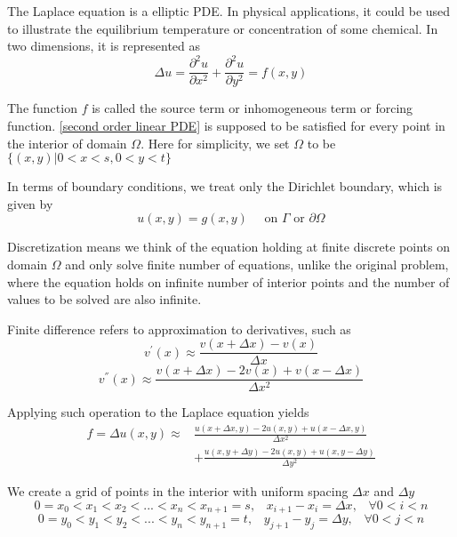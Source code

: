 	The Laplace equation is a elliptic PDE. In physical applications, it could be used to illustrate the equilibrium temperature or concentration of some chemical. In two dimensions, it is represented as
	\begin{equation}
		\Delta u = \frac{\partial^2u}{\partial x^2} + \frac{\partial^2u}{\partial y^2} = f(x, y)
		\label{Laplace Equation}
	\end{equation}
	
	The function $f$ is called the source term or inhomogeneous term or forcing function. \eqref{second order linear PDE} is supposed to be satisfied for every point in the interior of domain $\Omega$. Here for simplicity, we set $\Omega$ to be $\{(x, y) | 0 < x < s, 0 < y < t\}$
	
	In terms of boundary conditions, we treat only the Dirichlet boundary, which is given by 
	\begin{equation}
		u(x, y) = g(x, y) \quad \text{ on } \Gamma \text{ or } \partial \Omega
	\end{equation}
	
	Discretization means we think of the equation holding at finite discrete points on domain $\Omega$ and only solve finite number of equations, unlike the original problem, where the equation holds on infinite number of interior points and the number of values to be solved are also infinite.
	
	Finite difference refers to approximation to derivatives, such as $$v^{'}(x) \approx \frac{v(x + \Delta x) - v(x)}{\Delta x}$$ $$v^{''}(x) \approx \frac{v(x + \Delta x) - 2v(x) + v(x - \Delta x)}{\Delta x^2}$$
	
	Applying such operation to the Laplace equation yields
	\begin{equation}
	\begin{split}
		f = \Delta u(x, y) \approx & \frac{u(x + \Delta x, y) - 2u(x, y) + u(x - \Delta x, y)}{\Delta x^2}\\
		& + \frac{u(x, y + \Delta y) - 2u(x, y) + u(x, y - \Delta y)}{\Delta y^2}
	\end{split}
	\label{FDM of Laplace Equation}
	\end{equation}
	
	We create a grid of points in the interior with uniform spacing $\Delta x$ and $\Delta y$
	$$0 = x_0 < x_1 < x_2 < ... < x_n < x_{n+1} = s\text{,} \quad x_{i + 1} - x_i = \Delta x\text{,} \quad \forall 0 < i < n $$
	$$0 = y_0 < y_1 < y_2 < ... < y_n < y_{n+1} = t\text{,} \quad y_{j + 1} - y_j = \Delta y\text{,} \quad \forall 0 < j < n $$
	
